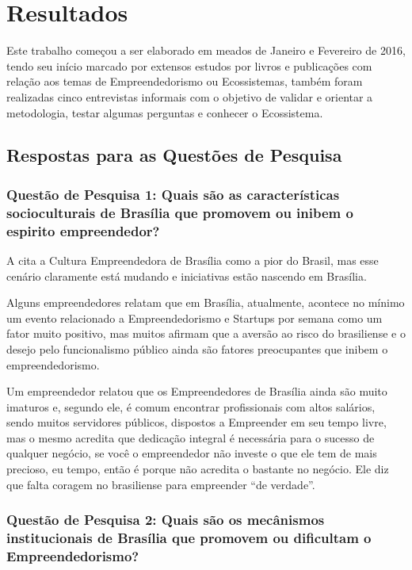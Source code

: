 \chapter[Resultados Parciais]{Resultados}
\label{cap-resultados}

Este trabalho começou a ser elaborado em meados de Janeiro e Fevereiro de 2016, tendo seu início marcado por extensos estudos por livros e publicações com relação aos temas de Empreendedorismo ou Ecossistemas, também foram realizadas cinco entrevistas informais com o objetivo de validar e orientar a metodologia, testar algumas perguntas e conhecer o Ecossistema.

\section{Respostas para as Questões de Pesquisa}
\label{section:perguntas_de_pesquisa}

\subsection{Questão de Pesquisa 1: Quais são as características socioculturais de Brasília que promovem ou inibem o espirito empreendedor?}
\label{subsection:pergunta_de_pesquisa_1}

A  cita a Cultura Empreendedora de Brasília como a pior do Brasil, mas esse cenário claramente está mudando e iniciativas estão nascendo em Brasília. 

Alguns empreendedores relatam que em Brasília, atualmente, acontece no mínimo um evento relacionado a Empreendedorismo e Startups por semana como um fator muito positivo, mas muitos afirmam que a aversão ao risco do brasiliense e o desejo pelo funcionalismo público ainda são fatores preocupantes que inibem o empreendedorismo.

Um empreendedor relatou que os Empreendedores de Brasília ainda são muito imaturos e, segundo ele, é comum encontrar profissionais com altos salários, sendo muitos servidores públicos, dispostos a Empreender em seu tempo livre, mas o mesmo acredita que dedicação integral é necessária para o sucesso de qualquer negócio, se você o empreendedor não investe o que ele tem de mais precioso, eu tempo, então é porque não acredita o bastante no negócio. Ele diz que falta coragem no brasiliense para empreender ``de verdade''.

\subsection{Questão de Pesquisa 2: Quais são os mecânismos institucionais de Brasília que promovem ou dificultam o Empreendedorismo?}
\label{subsection:pergunta_de_pesquisa_2}

